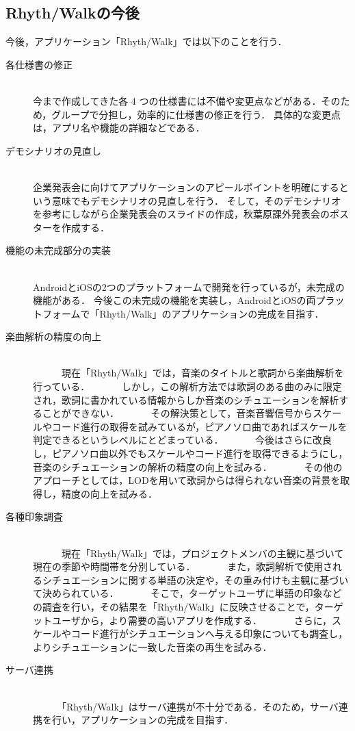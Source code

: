 \subsection{Rhyth/Walkの今後}
\par
今後，アプリケーション「Rhyth/Walk」では以下のことを行う．

\begin{description}
 \item[各仕様書の修正]\mbox{}\\ 
	    今まで作成してきた各 4 つの仕様書には不備や変更点などがある．そのため，グループで分担し，効率的に仕様書の修正を行う．
	    具体的な変更点は，アプリ名や機能の詳細などである．
	    
 \item[デモシナリオの見直し]\mbox{}\\
	    企業発表会に向けてアプリケーションのアピールポイントを明確にするという意味でもデモシナリオの見直しを行う．
	    そして，そのデモシナリオを参考にしながら企業発表会のスライドの作成，秋葉原課外発表会のポスターを作成する．

 \item[機能の未完成部分の実装]\mbox{}\\
	    AndroidとiOSの2つのプラットフォームで開発を行っているが，未完成の機能がある．
	    今後この未完成の機能を実装し，AndroidとiOSの両プラットフォームで「Rhyth/Walk」のアプリケーションの完成を目指す．

\item[楽曲解析の精度の向上]\mbox{}\\
　　　現在「Rhyth/Walk」では，音楽のタイトルと歌詞から楽曲解析を行っている．
　　　しかし，この解析方法では歌詞のある曲のみに限定され，歌詞に書かれている情報からしか音楽のシチュエーションを解析することができない．
　　　その解決策として，音楽音響信号からスケールやコード進行の取得を試みているが，ピアノソロ曲であればスケールを判定できるというレベルにとどまっている．
　　　今後はさらに改良し，ピアノソロ曲以外でもスケールやコード進行を取得できるようにし，音楽のシチュエーションの解析の精度の向上を試みる．
　　　その他のアプローチとしては，LODを用いて歌詞からは得られない音楽の背景を取得し，精度の向上を試みる．
　　　
\item[各種印象調査]\mbox{}\\
　　　現在「Rhyth/Walk」では，プロジェクトメンバの主観に基づいて現在の季節や時間帯を分別している．
　　　また，歌詞解析で使用されるシチュエーションに関する単語の決定や，その重み付けも主観に基づいて決められている．
　　　そこで，ターゲットユーザに単語の印象などの調査を行い，その結果を「Rhyth/Walk」に反映させることで，ターゲットユーザから，より需要の高いアプリを作成する．
　　　さらに，スケールやコード進行がシチュエーションへ与える印象についても調査し，よりシチュエーションに一致した音楽の再生を試みる．
　　　
\item[サーバ連携]\mbox{}\\
　　　「Rhyth/Walk」はサーバ連携が不十分である．そのため，サーバ連携を行い，アプリケーションの完成を目指す．


\end{description}
